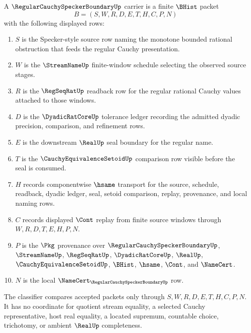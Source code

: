 \begin{definition}
\label{def:regular-cauchy-specker-boundary-carrier}
A $\RegularCauchySpeckerBoundaryUp$ carrier is a finite $\BHist$ packet
$$
B=(S,W,R,D,E,T,H,C,P,N)
$$
with the following displayed rows:
\begin{enumerate}
\item $S$ is the Specker-style source row naming the monotone bounded rational obstruction that feeds the regular Cauchy presentation.
\item $W$ is the $\StreamNameUp$ finite-window schedule selecting the observed source stages.
\item $R$ is the $\RegSeqRatUp$ readback row for the regular rational Cauchy values attached to those windows.
\item $D$ is the $\DyadicRatCoreUp$ tolerance ledger recording the admitted dyadic precision, comparison, and refinement rows.
\item $E$ is the downstream $\RealUp$ seal boundary for the regular name.
\item $T$ is the $\CauchyEquivalenceSetoidUp$ comparison row visible before the seal is consumed.
\item $H$ records componentwise $\hsame$ transport for the source, schedule, readback, dyadic ledger, seal, setoid comparison, replay, provenance, and local naming rows.
\item $C$ records displayed $\Cont$ replay from finite source windows through $W,R,D,T,E,H,P,N$.
\item $P$ is the $\Pkg$ provenance over $\RegularCauchySpeckerBoundaryUp$, $\StreamNameUp$, $\RegSeqRatUp$, $\DyadicRatCoreUp$, $\RealUp$, $\CauchyEquivalenceSetoidUp$, $\BHist$, $\hsame$, $\Cont$, and $\NameCert$.
\item $N$ is the local $\NameCert_{\RegularCauchySpeckerBoundaryUp}$ row.
\end{enumerate}
The classifier compares accepted packets only through $S,W,R,D,E,T,H,C,P,N$. It has no coordinate for quotient stream equality, a selected Cauchy representative, host real equality, a located supremum, countable choice, trichotomy, or ambient $\RealUp$ completeness.
\end{definition}

